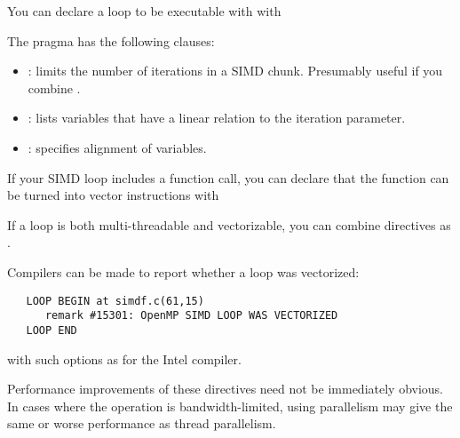 
You can declare a loop to be executable with
 with
%

The  pragma has the following clauses:
\begin{itemize}
\item {}: limits the number of iterations in a
  SIMD chunk. Presumably useful if you combine .
\item {}: lists variables that have a linear
  relation to the iteration parameter.
\item {}: specifies alignment of variables.
\end{itemize}

If your SIMD loop includes a function call, you can declare that the
function can be turned into vector instructions with
%

If a loop is both multi-threadable and vectorizable, you can combine
directives as .

Compilers can be made to report whether a loop was vectorized:
\begin{verbatim}
   LOOP BEGIN at simdf.c(61,15)
      remark #15301: OpenMP SIMD LOOP WAS VECTORIZED
   LOOP END
\end{verbatim}
with such options as  for the Intel compiler.

Performance improvements of these directives need not be immediately
obvious.  In cases where the operation is bandwidth-limited, using
 parallelism may give the same or worse performance as thread
parallelism.


